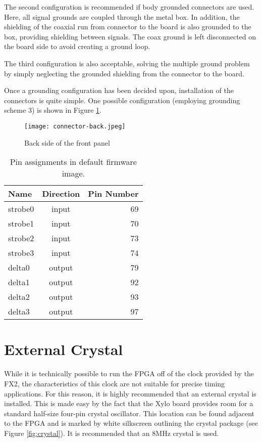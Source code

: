 The second configuration is recommended if body grounded connectors
are used. Here, all signal grounds are coupled through the metal
box. In addition, the shielding of the coaxial run from connector to
the board is also grounded to the box, providing shielding between
signals. The coax ground is left disconnected on the board side to
avoid creating a ground loop.

The third configuration is also acceptable, solving the multiple
ground problem by simply neglecting the grounded shielding from the
connector to the board.

Once a grounding configuration has been decided upon, installation of
the connectors is quite simple. One possible configuration (employing
grounding scheme 3) is shown in Figure \ref{fig:front-panel-rear}.

\begin{figure}
  \center
  \texttt{[image: connector-back.jpeg]}
  \caption{Back side of the front panel}
  \label{fig:front-panel-rear}
\end{figure}

\begin{table}
  \center
  \begin{tabular}{|lcr|}
    \hline
    Name    & Direction & Pin Number \\
    \hline
    strobe0 & input  & 69 \\
    strobe1 & input  & 70 \\
    strobe2 & input  & 73 \\
    strobe3 & input  & 74 \\
    \hline
    delta0  & output & 79 \\
    delta1  & output & 92 \\
    delta2  & output & 93 \\
    delta3  & output & 97 \\
    \hline
  \end{tabular}
  \caption{Pin assignments in default firmware image.}
  \label{table:pins}
\end{table}


\section{External Crystal}

While it is technically possible to run the FPGA off of the clock
provided by the FX2, the characteristics of this clock are not
suitable for precise timing applications. For this reason, it is
highly recommended that an external crystal is installed. This is made
easy by the fact that the Xylo board provides room for a standard
half-size four-pin crystal oscillator. This location can be found
adjacent to the FPGA and is marked by white silkscreen outlining the
crystal package (see Figure \ref{fig:crystal}). It is recommended that
an 8MHz crystal is used.

